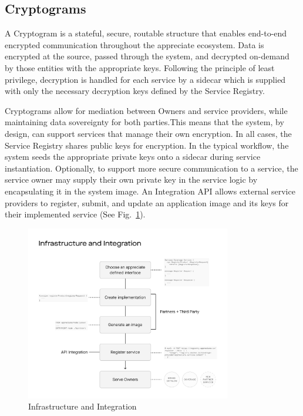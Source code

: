 \documentclass[a4paper,onecolumn, 10.5pt]{article}
\begin{document}
\subsection{Cryptograms}
A Cryptogram is a stateful, secure, routable structure that enables end-to-end encrypted communication throughout the appreciate ecosystem. Data is encrypted at the source, passed through the system, and decrypted on-demand by those entities with the appropriate keys. Following the principle of least privilege, decryption is handled for each service by a sidecar which is supplied with only the necessary decryption keys defined by the Service Registry.

Cryptograms allow for mediation between Owners and service providers, while maintaining data sovereignty for both parties.This means that the system, by design, can support services that manage their own encryption. In all cases, the Service Registry shares public keys for encryption. In the typical workflow, the system seeds the appropriate private keys onto a sidecar during service instantiation. Optionally, to support more secure communication to a service, the service owner may supply their own private key in the service logic by encapsulating it in the system image. An Integration API allows external service providers to register, submit, and update an application image and its keys for their implemented service (See Fig.~\ref{fig: infraint}).

\begin{figure}[!htb]
	\centering %
		\includegraphics[clip, trim=0cm 2cm 0cm 5cm, width=0.80\textwidth]{./images/Infrasctructure_and_integration.pdf}
	\caption{Infrastructure and Integration}
	\label{fig: infraint}
\end{figure}
\end{document}

